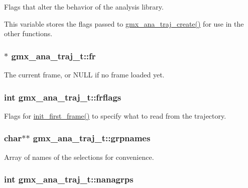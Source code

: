 \-Flags that alter the behavior of the analysis library. 

\-This variable stores the flags passed to \hyperlink{include_2trajana_8h_afc7e80051e814978605f1f690ec41c50}{gmx\-\_\-ana\-\_\-traj\-\_\-create()} for use in the other functions. \hypertarget{structgmx__ana__traj__t_a5f85f7e48402dccf3528c557a2392851}{
\subsubsection[{fr}]{$\ast$ {\bf gmx\-\_\-ana\-\_\-traj\-\_\-t\-::fr}}}\label{structgmx__ana__traj__t_a5f85f7e48402dccf3528c557a2392851}
\-The current frame, or {\ttfamily \-N\-U\-L\-L} if no frame loaded yet. \hypertarget{structgmx__ana__traj__t_ae7b0a4363430783635ca1af2369e5966}{
\subsubsection[{frflags}]{\setlength{\rightskip}{0pt plus 5cm}int {\bf gmx\-\_\-ana\-\_\-traj\-\_\-t\-::frflags}}}\label{structgmx__ana__traj__t_ae7b0a4363430783635ca1af2369e5966}


\-Flags for \hyperlink{trajana_8c_abf56fc7376d3da82470309d3a60435f3}{init\-\_\-first\-\_\-frame()} to specify what to read from the trajectory. 

\hypertarget{structgmx__ana__traj__t_a1888caa9f1f2bdfe47247501c6d0216b}{
\subsubsection[{grpnames}]{\setlength{\rightskip}{0pt plus 5cm}char$\ast$$\ast$ {\bf gmx\-\_\-ana\-\_\-traj\-\_\-t\-::grpnames}}}\label{structgmx__ana__traj__t_a1888caa9f1f2bdfe47247501c6d0216b}
\-Array of names of the selections for convenience. \hypertarget{structgmx__ana__traj__t_a58918d6931f4e6a197c2087c9b284fc4}{
\subsubsection[{nanagrps}]{\setlength{\rightskip}{0pt plus 5cm}int {\bf gmx\-\_\-ana\-\_\-traj\-\_\-t\-::nanagrps}}}\label{structgmx__ana__traj__t_a58918d6931f4e6a197c2087c9b284fc4}


